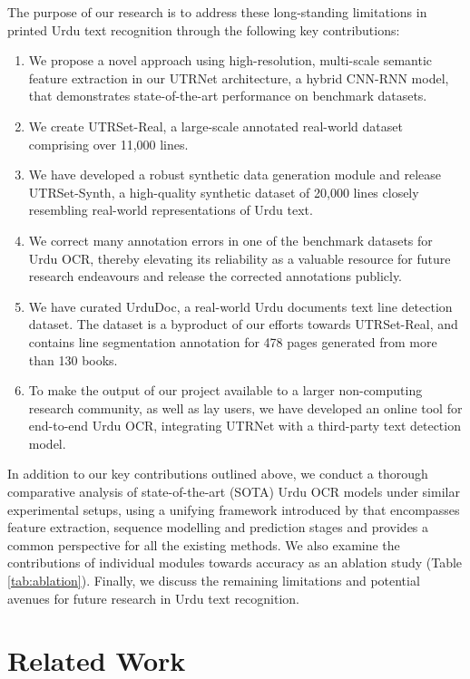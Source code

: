 \documentclass[runningheads]{llncs}
\newcommand{\ModelName}{{UTRNet}\xspace}
\newcommand{\DatasetNameReal}{{UTRSet-Real}\xspace}
\newcommand{\DatasetNameSynth}{{UTRSet-Synth}\xspace}
\newcommand{\DetectionDataset}{{UrduDoc}\xspace}
\begin{document}
The purpose of our research is to address these long-standing limitations in printed Urdu text recognition through the following key contributions:
\begin{enumerate}
\item We propose a novel approach using high-resolution, multi-scale semantic feature extraction in our \ModelName architecture, a hybrid CNN-RNN model, that demonstrates state-of-the-art performance on benchmark datasets.
\item We create \DatasetNameReal, a large-scale annotated real-world dataset comprising over 11,000 lines.
\item We have developed a robust synthetic data generation module and release \DatasetNameSynth, a high-quality synthetic dataset of 20,000 lines closely resembling real-world representations of Urdu text.
\item We correct many annotation errors in one of the benchmark datasets \cite{iiith17urdu} for Urdu OCR, thereby elevating its reliability as a valuable resource for future research endeavours and release the corrected annotations publicly.
\item We have curated {\DetectionDataset}, a real-world Urdu documents text line detection dataset. The dataset is a byproduct of our efforts towards \DatasetNameReal, and contains line segmentation annotation for 478 pages generated from more than 130 books. 
\item To make the output of our project available to a larger non-computing research community, as well as lay users, we have developed an online tool for end-to-end Urdu OCR, integrating \ModelName with a third-party text detection model.
\end{enumerate}

In addition to our key contributions outlined above, we conduct a thorough comparative analysis of state-of-the-art (SOTA) Urdu OCR models under similar experimental setups, using a unifying framework introduced by \cite{clovaai} that encompasses feature extraction, sequence modelling and prediction stages and provides a common perspective for all the existing methods. We also examine the contributions of individual modules towards accuracy as an ablation study (Table \ref{tab:ablation}). Finally, we discuss the remaining limitations and potential avenues for future research in Urdu text recognition.
%
 
\section{Related Work}
\label{section:related_work_section}
\end{document}
